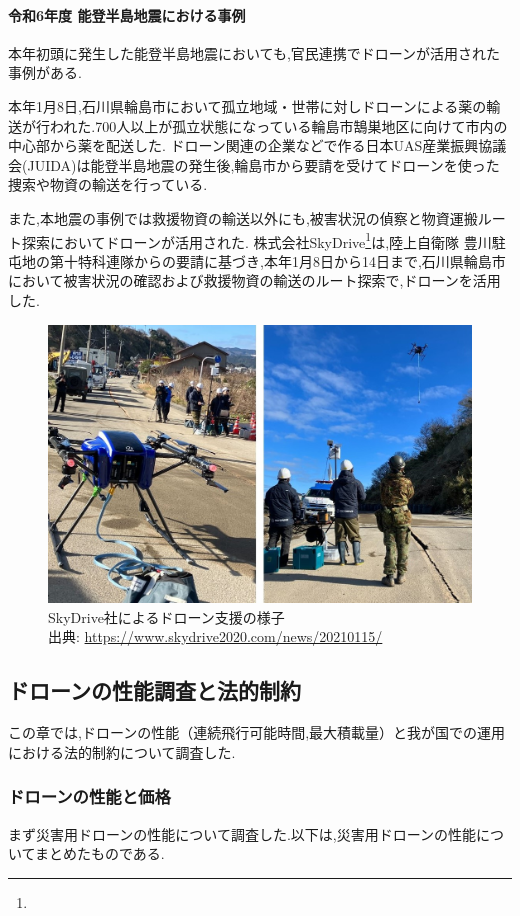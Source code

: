 \documentclass{article}[jsarticle]
\begin{document}
\paragraph{令和6年度 能登半島地震における事例}
本年初頭に発生した能登半島地震においても,官民連携でドローンが活用された事例がある.\par 
本年1月8日,石川県輪島市において孤立地域・世帯に対しドローンによる薬の輸送が行われた.700人以上が孤立状態になっている輪島市鵠巣地区に向けて市内の中心部から薬を配送した.
ドローン関連の企業などで作る日本UAS産業振興協議会(JUIDA)は能登半島地震の発生後,輪島市から要請を受けてドローンを使った捜索や物資の輸送を行っている.\par 
また,本地震の事例では救援物資の輸送以外にも,被害状況の偵察と物資運搬ルート探索においてドローンが活用された.
株式会社SkyDrive\footnote{}は,陸上自衛隊 豊川駐屯地の第十特科連隊からの要請に基づき,本年1月8日から14日まで,石川県輪島市において被害状況の確認および救援物資の輸送のルート探索で,ドローンを活用した.
\begin{figure}[H]
    \centering
    \includegraphics[scale=0.5]{./Images/202401311838.jpg}
    \caption{
        SkyDrive社によるドローン支援の様子 \\
        出典: \url{https://www.skydrive2020.com/news/20210115/}
    }
\end{figure}
\subsection{ドローンの性能調査と法的制約}
この章では,ドローンの性能（連続飛行可能時間,最大積載量）と我が国での運用における法的制約について調査した.
\subsubsection{ドローンの性能と価格}
まず災害用ドローンの性能について調査した.以下は,災害用ドローンの性能についてまとめたものである.
\end{document}
